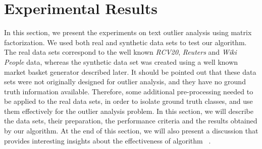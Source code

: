 \section{Experimental Results}
\label{sec:experimentation}

In this section, we present the experiments on text outlier analysis
using matrix factorization. We used both real and synthetic data
sets to test our algorithm. The  real data sets correspond to the
well known {\em RCV20}, {\em Reuters} and {\em Wiki People} data, whereas the
synthetic data set was created using a well known market basket
generator described later.  It should be pointed out that these data
sets were not originally designed for outlier analysis, and they
have no ground truth information available.  Therefore, some
additional pre-processing needed to be applied to the real data
sets, in order to isolate ground truth classes, and use them
effectively for the outlier analysis problem. In this section, we
will describe the data sets, their preparation, the performance
criteria and the results obtained by our algorithm. At the end of
this section, we will also present a discussion that provides
interesting insights about  the effectiveness of algorithm \algo\ .

